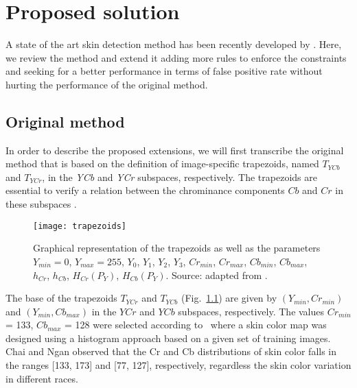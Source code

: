 \chapter{Proposed solution}
\label{cap:proposed-solution}

\noindent A state of the art skin detection method has been recently developed by \cite{brancati:17}. Here, we review the method and extend it adding more rules to enforce the constraints and seeking for a better performance in terms of false positive rate without hurting the performance of the original method.


\section{Original method}
\label{sec:original_method}
In order to describe the proposed extensions, we will first transcribe the original method that is based on the definition of image-specific trapezoids, named $T_{YCb}$ and $T_{YCr}$, in the \textit{YCb} and \textit{YCr} subspaces, respectively. The trapezoids are essential to verify a relation between the chrominance components $Cb$ and $Cr$ in these subspaces \citep{brancati:17}.

\begin{figure}[ht]
    \centering
    \texttt{[image: trapezoids]}
    \caption[Graphical representation of the trapezoids as well as its parameters]{Graphical representation of the trapezoids as well as the parameters $Y_{min} = 0$, $Y_{max} = 255$, $Y_{0}$, $Y_{1}$, $Y_{2}$, $Y_{3}$, $Cr_{min}$, $Cr_{max}$, $Cb_{min}$, $Cb_{max}$, $h_{Cr}$, $h_{Cb}$, $H_{Cr}(P_Y)$, $H_{Cb}(P_Y)$. Source: adapted from \citep{brancati:17}.}
    \label{fig:trapezoids}
\end{figure}

The base of the trapezoids $T_{YCr}$ and $T_{YCb}$ (Fig.~\ref{fig:trapezoids}) are given by $(Y_{min}, Cr_{min})$ and $(Y_{min}, Cb_{max})$ in the $YCr$ and $YCb$ subspaces, respectively. The values $Cr_{min}$ = 133, $Cb_{max}$ = 128 were selected according to~\citet{chai:99} where a skin color map was designed using a histogram approach based on a given set of training images. Chai and Ngan observed that the Cr and Cb distributions of skin color falls in the ranges [133, 173] and [77, 127], respectively, regardless the skin color variation in different races. 

